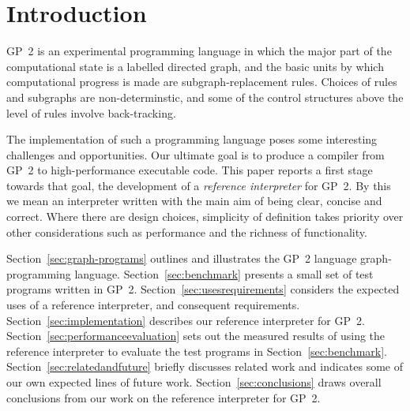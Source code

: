 \section{Introduction}

GP~2 is an experimental programming language in which the major part of
the computational state is a labelled directed graph, and the basic
units by which computational progress is made are subgraph-replacement
rules.
Choices of rules and subgraphs are non-determinstic, and some of
the control structures above the level of rules involve back-tracking.

The implementation of such a programming language poses some
interesting challenges and opportunities.
Our ultimate goal is to produce a compiler from GP~2 to
high-performance executable code.
This paper reports a first stage towards that goal, the development
of a \emph{reference interpreter} for GP~2.
By this we mean an interpreter written with the main aim of
being clear, concise and correct.
Where there are design choices, simplicity of
definition takes priority over other considerations
such as performance and the richness of functionality.

Section~\ref{sec:graph-programs} outlines and illustrates the GP~2 language
graph-programming language.
Section~\ref{sec:benchmark} presents a small set of test programs
written in GP~2.
Section~\ref{sec:usesrequirements} considers the expected uses of
a reference interpreter, and consequent requirements.
Section~\ref{sec:implementation} describes our reference interpreter for
GP~2.
Section~\ref{sec:performanceevaluation} sets out the measured results of using the reference
interpreter to evaluate the test programs in Section~\ref{sec:benchmark}.
Section~\ref{sec:relatedandfuture} briefly discusses related work and
indicates some of our own expected lines of future work.
Section~\ref{sec:conclusions} draws overall conclusions from our work
on the reference interpreter for GP~2.

